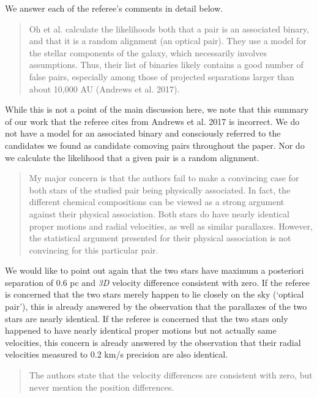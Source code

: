 \documentclass[12pt]{article}
\begin{document}
We answer each of {\sf the referee's comments} in detail below.

\begin{quote}
Oh et al. calculate the likelihoods both that a pair is an associated
binary, and that it is a random alignment (an optical pair). They use a
model for the stellar components of the galaxy, which necessarily
involves assumptions. Thus, their list of binaries likely contains a
good number of false pairs, especially among those of projected
separations larger than about 10,000 AU (Andrews et al. 2017).
\end{quote}

While this is not a point of the main discussion here, we note that this
summary of our work that the referee cites from Andrews et al. 2017 is
incorrect. We do not have a model for an associated binary and
consciously referred to the candidates we found as candidate comoving pairs
throughout the paper.
Nor do we calculate the likelihood that a given pair is a random alignment.

\begin{quote}
My major concern is that the authors fail to make a convincing case for
both stars of the studied pair being physically associated. In fact, the
different chemical compositions can be viewed as a strong argument
against their physical association. Both stars do have nearly identical
proper motions and radial velocities, as well as similar parallaxes.
However, the statistical argument presented for their physical
association is not convincing for this particular pair.
\end{quote}

We would like to point out again that the two stars have maximum a
posteriori separation of 0.6 pc and \emph{3D} velocity difference
consistent with zero. If the referee is concerned that the two stars
merely happen to lie closely on the sky (`optical pair'), this is already
answered by the observation that the parallaxes of the two stars are
nearly identical. If the referee is concerned that the two stars only
happened to have nearly identical proper motions but not actually same
velocities, this concern is already answered by the observation that
their radial velocities measured to 0.2 km/s precision are also
identical.

\begin{quote}
The authors state that the velocity differences are consistent with
zero, but never mention the position differences.
\end{quote}
\end{document}
